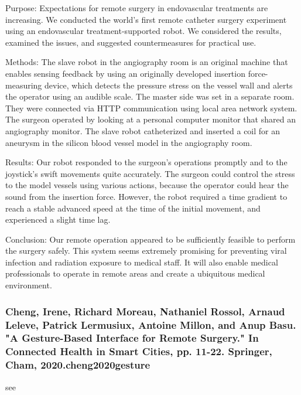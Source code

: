 \documentclass[conference]{IEEEtran}
\begin{document}
Purpose: Expectations for remote surgery in endovascular treatments are increasing. We conducted the world's first remote catheter surgery experiment using an endovascular treatment-supported robot. We considered the results, examined the issues, and suggested countermeasures for practical use.

Methods: The slave robot in the angiography room is an original machine that enables sensing feedback by using an originally developed insertion force-measuring device, which detects the pressure stress on the vessel wall and alerts the operator using an audible scale. The master side was set in a separate room. They were connected via HTTP communication using local area network system. The surgeon operated by looking at a personal computer monitor that shared an angiography monitor. The slave robot catheterized and inserted a coil for an aneurysm in the silicon blood vessel model in the angiography room.

Results: Our robot responded to the surgeon's operations promptly and to the joystick's swift movements quite accurately. The surgeon could control the stress to the model vessels using various actions, because the operator could hear the sound from the insertion force. However, the robot required a time gradient to reach a stable advanced speed at the time of the initial movement, and experienced a slight time lag.

Conclusion: Our remote operation appeared to be sufficiently feasible to perform the surgery safely. This system seems extremely promising for preventing viral infection and radiation exposure to medical staff. It will also enable medical professionals to operate in remote areas and create a ubiquitous medical environment.

\medskip
\subsubsection{Cheng, Irene, Richard Moreau, Nathaniel Rossol, Arnaud Leleve, Patrick Lermusiux, Antoine Millon, and Anup Basu. "A Gesture-Based Interface for Remote Surgery." In Connected Health in Smart Cities, pp. 11-22. Springer, Cham, 2020.cheng2020gesture}
see \cite{cheng2020gesture}
\end{document}
